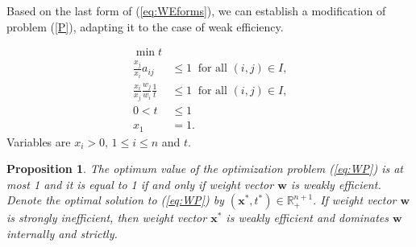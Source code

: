 \documentclass{article}
\theoremstyle{plain}
\newtheorem{proposition}{Proposition}[section]
\begin{document}
Based on the last form of (\ref{eq:WEforms}), we can establish a modif{\kern0pt}ication of problem (\ref{P}), adapting it to the case of weak ef{\kern0pt}f{\kern0pt}iciency.


\begin{align}
\min t
     &    \nonumber  \\
\frac{x_j}{x_i} a_{ij} & \leq 1 \ \text{ for all $(i,j) \in I$,} \nonumber  \\
\frac{x_i}{x_j} \frac{w_j}{w_i} \frac{1}{t}  & \leq 1 \ \text{ for all $(i,j) \in I$,} \label{eq:WP}  \\
0 < t & \leq 1  \nonumber  \\                   x_1 & = 1.    \nonumber
\end{align}
Variables are $x_i > 0, \,  1 \leq i \leq n$ and $t$. \\

\begin{proposition} \label{prop:WP}
The optimum value of the optimization problem (\ref{eq:WP}) is at most 1 and it is equal to 1 if and only if
weight vector $\mathbf{w}$ is weakly ef{\kern0pt}f{\kern0pt}icient.
Denote the optimal solution to (\ref{eq:WP}) by $(\mathbf{x}^{\ast},t^{\ast}) \in \mathbb{R}^{n+1}_{+}.$
If weight vector $\mathbf{w}$ is strongly inef{\kern0pt}f{\kern0pt}icient, then
weight vector $\mathbf{x}^{\ast}$ is weakly ef{\kern0pt}f{\kern0pt}icient and dominates $\mathbf{w}$ internally and strictly.
\end{proposition}
\end{document}
